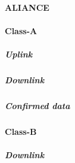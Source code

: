 \paragraph{ALIANCE}


\paragraph{Class-A}

\subparagraph{Uplink}

\subparagraph{Downlink}

\subparagraph{Confirmed data}


\paragraph{Class-B}

\subparagraph{Downlink}

